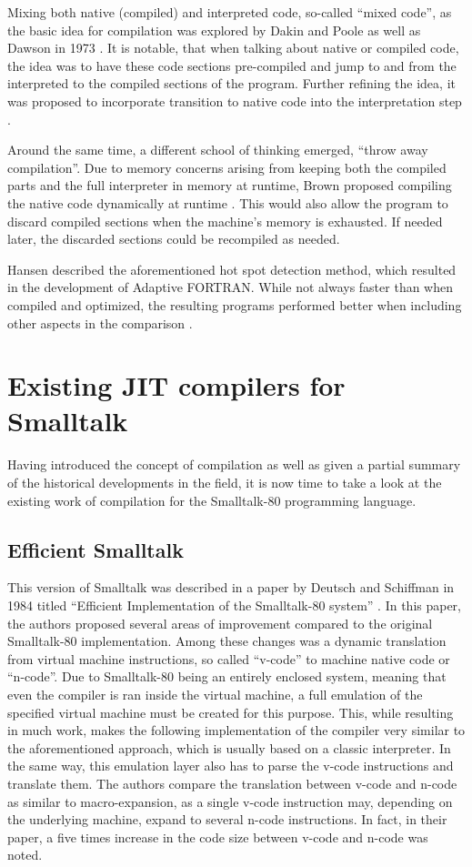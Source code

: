 Mixing both native (compiled) and interpreted code, so-called \enquote{mixed code}, as the basic idea for \jit{} compilation was explored by Dakin and Poole as well as Dawson in 1973 \cites{Dakin1973, Dawson1973}.
It is notable, that when talking about native or compiled code, the idea was to have these code sections pre-compiled and jump to and from the interpreted to the compiled sections of the program. 
Further refining the idea, it was proposed to incorporate transition to native code into the interpretation step \cite{Pittman1987}.

Around the same time, a different school of thinking emerged, \enquote{throw away compilation}. Due to memory concerns arising from keeping both the compiled parts and the full interpreter in memory at runtime, Brown proposed compiling the native code dynamically at runtime \cite{Brown1976}.
This would also allow the program to discard compiled sections when the machine's memory is exhausted. If needed later, the discarded sections could be recompiled as needed.

Hansen described the aforementioned hot spot detection method, which resulted in the development of Adaptive FORTRAN.
While not always faster than when compiled and optimized, the resulting programs performed better when including other aspects in the comparison \cite{Hansen1974}.

\section{Existing JIT compilers for Smalltalk}
Having introduced the concept of \jit{} compilation as well as given a partial summary of the historical developments in the field, it is now time to take a look at the existing work of \jit{} compilation for the Smalltalk-80 programming language. 

\subsection{Efficient Smalltalk}
This version of Smalltalk was described in a paper by Deutsch and Schiffman in 1984 titled \enquote{Efficient Implementation of the Smalltalk-80 system} \cite{Deutsch1984}.
In this paper, the authors proposed several areas of improvement compared to the original Smalltalk-80 implementation. 
Among these changes was a dynamic translation from virtual machine instructions, so called \enquote{v-code} to machine native code or \enquote{n-code}. 
Due to Smalltalk-80 being an entirely enclosed system, meaning that even the compiler is ran inside the virtual machine, a full emulation of the specified virtual machine must be created for this purpose. 
This, while resulting in much work, makes the following implementation of the \jit{} compiler very similar to the aforementioned approach, which is usually based on a classic interpreter. In the same way, this emulation layer also has to parse the v-code instructions and translate them. 
The authors compare the translation between v-code and n-code as similar to macro-expansion, as a single v-code instruction may, depending on the underlying machine, expand to several n-code instructions. In fact, in their paper, a five times increase in the code size between v-code and n-code was noted.

